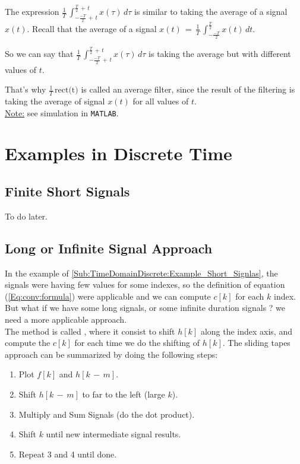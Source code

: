 The expression $ \displaystyle\frac{1}{T} \, \int_{- \frac{-T}{2} \, + \,t}^{\frac{T}{2} \, + \,t} x(\tau) \, d\tau$ is similar to taking the average of a signal $x(t)$. Recall that the average of a signal $x(t) \, = \, \displaystyle\frac{1}{T} \, \int_{-\frac{-T}{2}}^{\frac{T}{2}} x(t) \, dt$.

So we can say that $\displaystyle\frac{1}{T} \, \int_{- \frac{-T}{2} \, + \,t}^{\frac{T}{2} \, + \,t} x(\tau) \, d\tau$ is taking the average but with different values of $t$. 

That's why $\displaystyle\frac{1}{T} \, \text{rect(t)}$ is called an average filter, since the result of the filtering is taking the average of signal $x(t)$ for all values of $t$.\\

\underline{Note:} see simulation in \verb|MATLAB|.

\newpage
\section{Examples in Discrete Time}

\subsection{Finite Short Signals}
\label{Sub:TimeDomainDiscrete:Example_Short_Signlas}

To do later.


\subsection{Long or Infinite Signal Approach}

In the example of \autoref{Sub:TimeDomainDiscrete:Example_Short_Signlas}, the signals were having few values for some indexes, so the definition of equation (\ref{Eq:conv:formula}) were applicable and we can compute $c[k]$ for each $k$ index. But what if we have some long signals, or some infinite duration signals ? we need a more applicable approach.\\


The method is called , where it consist to shift $h[k]$ along the index axis, and compute the $c[k]$ for each time we do the shifting of $h[k]$. The sliding tapes approach can be summarized by doing the following steps:

\begin{enumerate}

\item Plot $f[k]$ and $h[k \, - \, m]$.

\item Shift $h[k \, - \, m]$ to far to the left (large $k$).

\item Multiply and Sum Signals (do the dot product).

\item Shift $k$ until new intermediate signal results.

\item Repeat 3 and 4 until done.

\end{enumerate}

